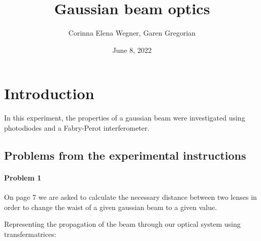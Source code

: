 \documentclass{article}
\begin{document}
 

\begin{titlepage}
\title{Gaussian beam optics}
\author{Corinna Elena Wegner, Garen Gregorian}
\date{June 8, 2022}
\maketitle %
\end{titlepage}

\newpage
\tableofcontents
\newpage

\section{Introduction} 

In this experiment, the properties of a gaussian beam were investigated using photodiodes and a Fabry-Perot interferometer.

\subsection{Problems from the experimental instructions}

\paragraph{Problem 1}

On page 7 we are asked to calculate the necessary distance between two lenses in order to change the waist of a given gaussian beam to a given value.

Representing the propagation of the beam through our optical system using transfermatrices:
\end{document}
